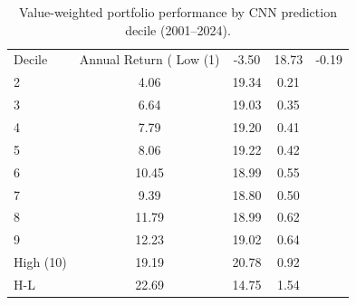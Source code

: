 \begin{table}[ht]
\centering
\caption{Value-weighted portfolio performance by CNN prediction decile (2001–2024).}
\label{tab:portfolio_vw}
\begin{tabular}{lccc}
\toprule
Decile & Annual Return (%
\midrule
Low (1) & -3.50 & 18.73 & -0.19 \\
2 & 4.06 & 19.34 & 0.21 \\
3 & 6.64 & 19.03 & 0.35 \\
4 & 7.79 & 19.20 & 0.41 \\
5 & 8.06 & 19.22 & 0.42 \\
6 & 10.45 & 18.99 & 0.55 \\
7 & 9.39 & 18.80 & 0.50 \\
8 & 11.79 & 18.99 & 0.62 \\
9 & 12.23 & 19.02 & 0.64 \\
High (10) & 19.19 & 20.78 & 0.92 \\
H-L & 22.69 & 14.75 & 1.54 \\
\bottomrule
\end{tabular}
\end{table}

